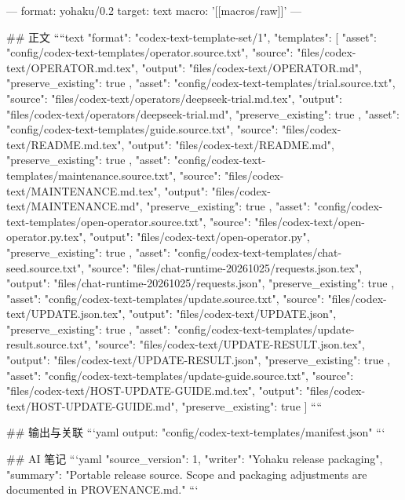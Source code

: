 ---
format: yohaku/0.2
target: text
macro: '[[macros/raw]]'
---

## 正文
````text
{
  "format": "codex-text-template-set/1",
  "templates": [
    {
      "asset": "config/codex-text-templates/operator.source.txt",
      "source": "files/codex-text/OPERATOR.md.tex",
      "output": "files/codex-text/OPERATOR.md",
      "preserve_existing": true
    },
    {
      "asset": "config/codex-text-templates/trial.source.txt",
      "source": "files/codex-text/operators/deepseek-trial.md.tex",
      "output": "files/codex-text/operators/deepseek-trial.md",
      "preserve_existing": true
    },
    {
      "asset": "config/codex-text-templates/guide.source.txt",
      "source": "files/codex-text/README.md.tex",
      "output": "files/codex-text/README.md",
      "preserve_existing": true
    },
    {
      "asset": "config/codex-text-templates/maintenance.source.txt",
      "source": "files/codex-text/MAINTENANCE.md.tex",
      "output": "files/codex-text/MAINTENANCE.md",
      "preserve_existing": true
    },
    {
      "asset": "config/codex-text-templates/open-operator.source.txt",
      "source": "files/codex-text/open-operator.py.tex",
      "output": "files/codex-text/open-operator.py",
      "preserve_existing": true
    },
    {
      "asset": "config/codex-text-templates/chat-seed.source.txt",
      "source": "files/chat-runtime-20261025/requests.json.tex",
      "output": "files/chat-runtime-20261025/requests.json",
      "preserve_existing": true
    },
    {
      "asset": "config/codex-text-templates/update.source.txt",
      "source": "files/codex-text/UPDATE.json.tex",
      "output": "files/codex-text/UPDATE.json",
      "preserve_existing": true
    },
    {
      "asset": "config/codex-text-templates/update-result.source.txt",
      "source": "files/codex-text/UPDATE-RESULT.json.tex",
      "output": "files/codex-text/UPDATE-RESULT.json",
      "preserve_existing": true
    },
    {
      "asset": "config/codex-text-templates/update-guide.source.txt",
      "source": "files/codex-text/HOST-UPDATE-GUIDE.md.tex",
      "output": "files/codex-text/HOST-UPDATE-GUIDE.md",
      "preserve_existing": true
    }
  ]
}
````

## 输出与关联
```yaml
output: "config/codex-text-templates/manifest.json"
```

## AI 笔记
```yaml
{"source_version": 1, "writer": "Yohaku release packaging", "summary": "Portable release source. Scope and packaging adjustments are documented in PROVENANCE.md."}
```

